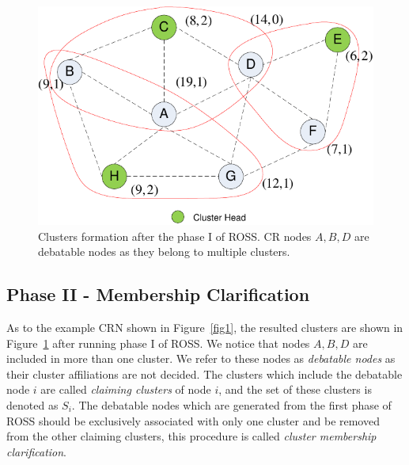 \documentclass[10pt,journal,compsoc]{IEEEtran}
\makeatletter
\theoremstyle{mytheoremstyle}
\theoremstyle{mytheoremstyle}
\theoremstyle{mytheoremstyle}
\renewenvironment{proof}[1][\proofname]{%
      \par\pushQED{\qed}\fontfamily{ptm}\selectfont%
      \topsep6\p@\@plus6\p@\relax
      \trivlist\item[\hskip\labelsep\bfseries#1\@addpunct{.}]%
      \ignorespaces
    }{%
      \popQED\endtrivlist\@endpefalse
    }
\makeatother
\begin{document}
\begin{figure}[ht!]
  \centering
  \includegraphics[width=0.5\linewidth]{figure2.pdf}
  \caption{Clusters formation after the phase I of ROSS. CR nodes $A, B, D$ are debatable nodes as they belong to multiple clusters.}
  \label{fig2}
\end{figure}


\subsection{Phase II - Membership Clarification}
\label{membershipClarification}
As to the example CRN shown in Figure~\ref{fig1}, the resulted clusters are shown in Figure~\ref{fig2} after running phase I of ROSS.
We notice that nodes $A, B, D$ are included in more than one cluster. 
We refer to these nodes as \textit{debatable nodes} as their cluster affiliations are not decided.
The clusters which include the debatable node $i$ are called \textit{claiming clusters} of node $i$, and the set of these clusters is denoted as $S_i$.  
The debatable nodes which are generated from the first phase of ROSS should be exclusively associated with only one cluster and be removed from the other claiming clusters, this procedure is called \textit{cluster membership clarification}.


%
\end{document}
